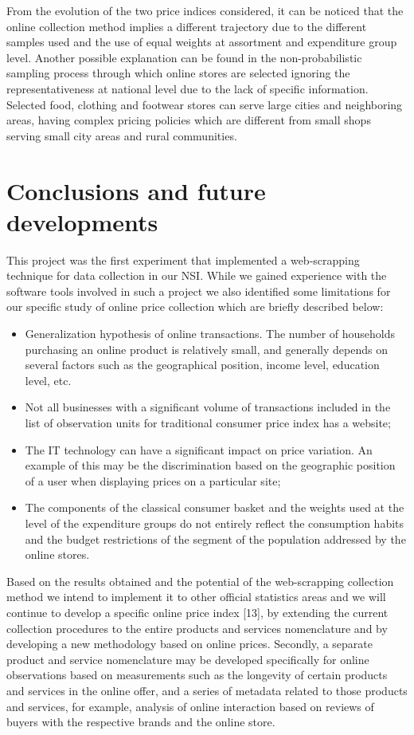 \documentclass[]{article}
\begin{document}
From the evolution of the two price indices considered, it can be noticed that the online 
collection method implies a different trajectory due to the different samples used and the use 
of equal weights at assortment and expenditure group level. Another possible explanation can be found 
in the non-probabilistic sampling process through which online stores are selected ignoring the 
representativeness at national level due to the lack of specific information. Selected food, 
clothing and footwear stores can serve large cities and neighboring areas, having complex pricing 
policies which are different from small shops serving small city areas and rural communities.


\section{Conclusions and future developments}\label{conclusions}

This project was the first experiment that implemented a web-scrapping technique for data collection 
in our NSI. While we gained experience with the software tools involved in such a project we also 
identified some limitations for our specific study of online price collection which are briefly described below:
\begin{itemize}
\item Generalization hypothesis of online transactions. The number of households purchasing an 
online product is relatively small, and generally depends on several factors such as the geographical position, 
income level, education level, etc.
\item Not all businesses with a significant volume of transactions included in the list of observation 
units for traditional consumer price index has a website;
\item The IT technology can have a significant impact on price variation. An example of this may be the discrimination 
based on the geographic position of a user when displaying prices on a particular site;
\item The components of the classical consumer basket and the weights used at the level of the expenditure groups do not entirely reflect the consumption habits and the budget restrictions of the segment of the population addressed by the online stores.
\end{itemize}


Based on the results obtained and the potential of the web-scrapping collection method we intend to implement 
it to other official statistics areas and we will continue to develop a specific online price index [13], 
by extending the current collection procedures to the entire products and services nomenclature and by 
developing a new methodology based on online prices. Secondly, a separate product and service nomenclature may 
be developed specifically for online observations based on measurements such as the longevity of certain products 
and services in the online offer, and a series of metadata related to those products and services, for example, analysis of 
online interaction based on reviews of buyers with the respective brands and the online store.
\end{document}
